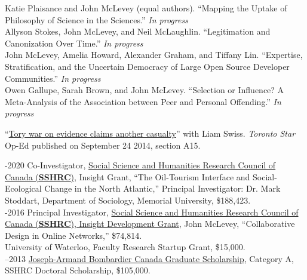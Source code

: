 \documentclass[9pt,usenames,dvipsnames]{article}
\begin{document}
\ind Katie Plaisance and John McLevey (equal authors). ``Mapping the Uptake of Philosophy of Science in the Sciences.'' \emph{In progress}\\

\ind Allyson Stokes, John McLevey, and Neil McLaughlin. ``Legitimation and Canonization Over Time.'' \emph{In progress}\\

\ind John McLevey, Amelia Howard, Alexander Graham, and Tiffany Lin. ``Expertise, Stratification, and the Uncertain Democracy of Large Open Source Developer Communities.'' \emph{In progress}\\

\ind Owen Gallupe, Sarah Brown, and John McLevey. ``Selection or Influence? A Meta-Analysis of the Association between Peer and Personal Offending.'' \emph{In progress} \\


\ind ``\href{http://bit.ly/1ohSn1N}{Tory war on evidence claims another casualty}'' with Liam Swiss. \emph{Toronto Star} Op-Ed published on September 24 2014, section A15. \\


-2020 Co-Investigator, \href{http://www.sshrc-crsh.gc.ca/funding-financement/programs-programmes/insight_development_grants-su
bventions_de_developpement_savoir-eng.aspx}{Social Science and Humanities Research Council of Canada (\textbf{SSHRC})}, Insight Grant, ``The Oil-Tourism Interface and Social-Ecological Change in the North Atlantic,'' Principal Investigator: Dr. Mark Stoddart, Department of Sociology, Memorial University, \$188,423. \\

-2016 Principal Investigator, \href{http://www.sshrc-crsh.gc.ca/funding-financement/programs-programmes/insight_development_grants-su
bventions_de_developpement_savoir-eng.aspx}{Social Science and Humanities Research Council of Canada (\textbf{SSHRC}), Insight Development Grant}, John McLevey, ``Collaborative Design in Online Networks,'' \$74,814. \\

 University of Waterloo, Faculty Research Startup Grant, \$15,000. \\

–2013 \href{http://www.sshrc-crsh.gc.ca/funding-financement/programs-programmes/fellowships/doctoral-doctorat-eng.aspx}{Joseph-Armand Bombardier Canada Graduate Scholarship}, Category A, SSHRC Doctoral Scholarship, \$105,000.\\
\end{document}

